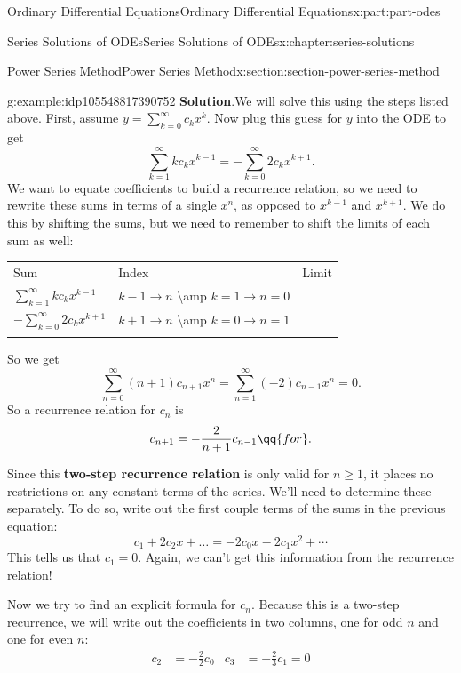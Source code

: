 \documentclass[twoside,10pt,]{book}
\newcommand{\blocktitlefont}{\relax}
\newcommand{\tabularfont}{\relax}
\newcommand{\terminology}[1]{\textbf{#1}}
\numberwithin{equation}{part}
\newcommand{\hrulethick} {\noalign{\hrule height 0.11em}}
\newcommand{\amp}{&}
\begin{document}
\begin{partptx}{Ordinary Differential Equations}{}{Ordinary Differential Equations}{}{}{x:part:part-odes}
\begin{chapterptx}{Series Solutions of ODEs}{}{Series Solutions of ODEs}{}{}{x:chapter:series-solutions}
\begin{sectionptx}{Power Series Method}{}{Power Series Method}{}{}{x:section:section-power-series-method}
\begin{example}{}{g:example:idp105548817390752}
\noindent\textbf{\blocktitlefont Solution}.\hypertarget{g:solution:idp105548817391648}{}\quad{}We will solve this using the steps listed above. First, assume \(y = \sum_{k=0}^{\infty}c_{k}x^{k}\). Now plug this guess for \(y\) into the ODE to get%
\begin{equation*}
\sum_{k=1}^{\infty}kc_{k}x^{k-1} = -\sum_{k=0}^{\infty}2c_{k}x^{k+1}.
\end{equation*}
We want to equate coefficients to build a recurrence relation, so we need to rewrite these sums in terms of a single \(x^{n}\), as opposed to \(x^{k-1}\) and \(x^{k+1}\). We do this by shifting the sums, but we need to remember to shift the limits of each sum as well:%
\begin{center}%
{\tabularfont%
\begin{tabular}{lll}\hrulethick
Sum&Index&Limit\tabularnewline\hrulethick
\(\sum_{k=1}^{\infty}kc_{k}x^{k-1}\)&\(k-1\to n\) \textbackslash{}amp \(k=1\to n=0\)\tabularnewline[0pt]
\(-\sum_{k=0}^{\infty}2c_{k}x^{k+1}\)&\(k+1\to n\) \textbackslash{}amp \(k=0\to n=1\)\tabularnewline\hrulethick
\end{tabular}
}%
\end{center}%
So we get%
\begin{equation*}
\sum_{n=0}^{\infty}(n+1)c_{n+1}x^{n} = \sum_{n=1}^{\infty}(-2)c_{n-1}x^{n} = 0.
\end{equation*}
So a recurrence relation for \(c_{n}\) is%
\begin{equation*}
c_{n+1} = -\frac{2}{n+1}c_{n-1}\qq{for }.
\end{equation*}
%
\par
Since this \terminology{two-step recurrence relation} is only valid for \(n\geq1\), it places no restrictions on any constant terms of the series. We'll need to determine these separately. To do so, write out the first couple terms of the sums in the previous equation:%
\begin{equation*}
c_{1}+2c_{2}x+\dots = -2c_{0}x -2c_{1}x^{2}+\cdots
\end{equation*}
This tells us that \(c_{1} = 0\). Again, we can't get this information from the recurrence relation!%
\par
Now we try to find an explicit formula for \(c_{n}\). Because this is a two-step recurrence, we will write out the coefficients in two columns, one for odd \(n\) and one for even \(n\):%
\begin{align*}
c_{2} \amp= -\frac{2}{2}c_{0} \amp c_{3} \amp= -\frac{2}{3}c_{1} = 0\\

\end{align*}
\end{example}
\end{sectionptx}
\end{chapterptx}
\end{partptx}
\end{document}
